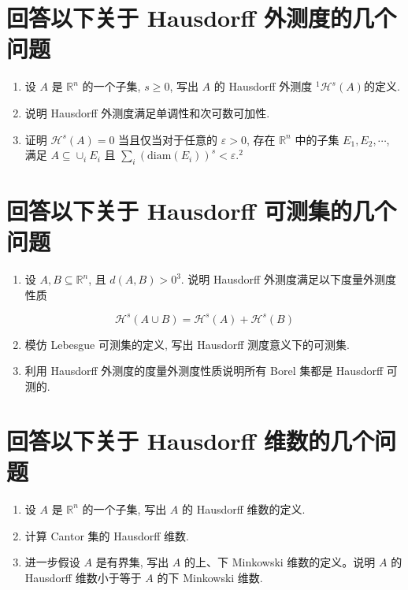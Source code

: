 \documentclass[hyperref,a4paper,UTF8]{ctexart}
\begin{document}
\section*{回答以下关于 Hausdorff 外测度的几个问题}
\begin{enumerate}
  \item 设 $A$ 是 $\mathbb{R}^{n}$ 的一个子集, $s \geq 0$, 写出 $A$ 的 Hausdorff 外测度 ${ }^{1} \mathcal{H}^{s}(A)$的定义.

  \item 说明 Hausdorff 外测度满足单调性和次可数可加性.

  \item 证明 $\mathcal{H}^{s}(A)=0$ 当且仅当对于任意的 $\varepsilon>0$, 存在 $\mathbb{R}^{n}$ 中的子集 $E_{1}, E_{2}, \cdots$, 满足 $A \subseteq \cup_{i} E_{i}$ 且 $\sum_{i}\left(\mathrm{\mathrm{diam}}\left(E_{i}\right)\right)^{s}<\varepsilon .^{2}$

\end{enumerate}

\section*{回答以下关于 Hausdorff 可测集的几个问题}
\begin{enumerate}
  \item 设 $A, B \subseteq \mathbb{R}^{n}$, 且 $d(A, B)>0^{3}$. 说明 Hausdorff 外测度满足以下度量外测度性质
\end{enumerate}

$$
\mathcal{H}^{s}(A \cup B)=\mathcal{H}^{s}(A)+\mathcal{H}^{s}(B)
$$

\begin{enumerate}
  \setcounter{enumi}{1}
  \item 模仿 Lebesgue 可测集的定义, 写出 Hausdorff 测度意义下的可测集.

  \item 利用 Hausdorff 外测度的度量外测度性质说明所有 Borel 集都是 Hausdorff 可测的.

\end{enumerate}

\section*{回答以下关于 Hausdorff 维数的几个问题}
\begin{enumerate}
  \item 设 $A$ 是 $\mathbb{R}^{n}$ 的一个子集, 写出 $A$ 的 Hausdorff 维数的定义.

  \item 计算 Cantor 集的 Hausdorff 维数.

  \item 进一步假设 $A$ 是有界集, 写出 $A$ 的上、下 Minkowski 维数的定义。说明 $A$ 的 Hausdorff 维数小于等于 $A$ 的下 Minkowski 维数.

\end{enumerate}
\end{document}
